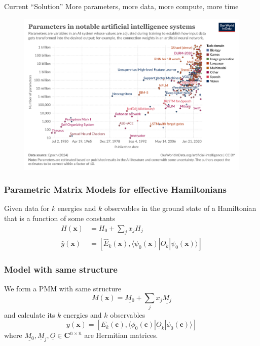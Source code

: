\documentclass[11pt]{beamer} %
\begin{document}
\begin{frame}[t]{Current ``Solution''}
    More parameters, more data, more compute, more time
    \begin{figure}
        \centering
        \includegraphics[height=0.7\textheight]{./Figures/artificial-intelligence-parameter-count.pdf}
    \end{figure}
\end{frame}


\begin{frame}
\frametitle{Parametric Matrix Models for effective Hamiltonians}

Given data for $k$ energies and $k$ observables in the ground state of a Hamiltonian that is a function of some constants
\[
\begin{aligned}
    H(\mathbf{x}) &= H_0 +\sum_jx_jH_j\\
      \hat{y}(\mathbf{x}) &= [\hat{E}_k(\mathbf{x}),\langle\psi_0(\mathbf{x})|\hat{O}_k|\psi_0(\mathbf{x})\rangle]
      \end{aligned}
\]
\end{frame}

\begin{frame}
\frametitle{Model with same structure}

We form a PMM with same structure
\[
    M(\mathbf{x}) = \underline{M_0} + \sum_jx_j\underline{M_j}
\]
and calculate its $k$ energies and $k$ observables
\begin{equation}
    y(\mathbf{x}) = [E_k(\mathbf{c}),\langle\phi_0(\mathbf{c})|\underline{O}_k|\phi_0(\mathbf{c})\rangle]
\end{equation}
where $\underline{M_0},\underline{M}_j,\underline{O}\in\mathbf{C}^{\overline{n}\times\overline{n}}$ are Hermitian matrices.
\end{frame}
\end{document}

